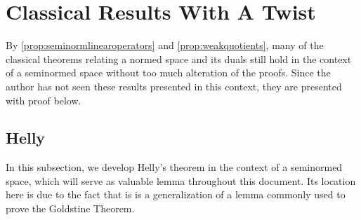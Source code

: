 
\section{Classical Results With A Twist}

By \ref{prop:seminormlinearoperators} and \ref{prop:weakquotients}, many of the classical theorems relating a normed space and its duals still hold in the context of a seminormed space without too much alteration of the proofs. Since the author has not seen these results presented in this context, they are presented with proof below. 
\subsection{Helly}
In this subsection, we develop Helly's theorem in the context of a seminormed space, which will serve as valuable lemma throughout this document. Its location here is due to the fact that  is is a generalization of a lemma commonly used to prove the Goldstine Theorem. 
